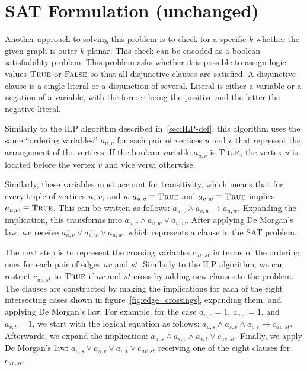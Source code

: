 \section{SAT Formulation (unchanged)}\label{sec:SAT-def}

Another approach to solving this problem is to check for a specific $k$ whether the given graph is outer-$k$-planar.
This check can be encoded as a boolean satisfiability problem.
This problem asks whether it is possible to assign logic values $\textsc{True}$ or $\textsc{False}$ so that all disjunctive clauses are satisfied.
A disjunctive clause is a single literal or a disjunction of several.
Literal is either a variable or a negation of a variable, with the former being the positive and the latter the negative literal.


Similarly to the ILP algorithm described in~\ref{sec:ILP-def}, this algorithm uses the same ``ordering variables'' $a_{u, v}$ for each pair of vertices $u$ and $v$ that represent the arrangement of the vertices.
If the boolean variable $a_{u, v}$ is $\textsc{True}$, the vertex $u$ is located before the vertex $v$ and vice versa otherwise.

Similarly, these variables must account for transitivity, which means that for every triple of vertices $u$, $v$, and $w$ $a_{u, v} \equiv \textsc{True}$ and $a_{v, w} \equiv \textsc{True}$ implies $a_{u, w} \equiv \textsc{True}$.
This can be written as follows: $a_{u, v} \land a_{v, w} \rightarrow a_{u, w}$.
Expanding the implication, this transforms into $\overline{a_{u, v} \land a_{v, w}} \lor a_{u, w}$.
After applying De Morgan's law, we receive $\overline{a_{u, v}} \lor \overline{a_{v, w}} \lor a_{u, w}$, which represents a clause in the SAT problem.

The next step is to represent the crossing variables $c_{uv, st}$ in terms of the ordering ones for each pair of edges $uv$ and $st$.
Similarly to the ILP algorithm, we can restrict $c_{uv, st}$ to $\textsc{True}$ if $uv$ and $st$ cross by adding new clauses to the problem.
The clauses are constructed by making the implications for each of the eight intersecting cases shown in figure~\ref{fig:edge_crossings}, expanding them, and applying De Morgan's law.
For example, for the case $a_{u,s} = 1$, $a_{s,v} = 1$, and $a_{v,t} = 1$, we start with the logical equation as follows: $a_{u,s} \land a_{s,v} \land a_{v,t} \rightarrow c_{uv, st}$.
Afterwards, we expand the implication: $\overline{a_{u,s} \land a_{s,v} \land a_{v,t}} \lor c_{uv, st}$.
Finally, we apply De Morgan's law: $\overline{a_{u,s}} \lor \overline{a_{s,v}} \lor \overline{a_{v,t}} \lor c_{uv, st}$ receiving one of the eight clauses for $c_{uv, st}$.

